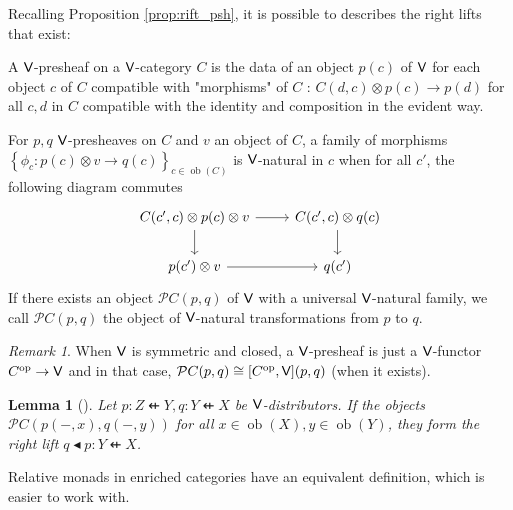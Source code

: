 \documentclass[10pt,a4paper]{article}
\newcommand{\ca}[1]{\mathcal{#1}}
\newcommand{\cat}[1]{\textcat{#1}}
\newcommand{\textcat}[1]{{\normalfont\textsf{#1}}}
\newcommand{\dfrom}{\nvleftarrow}
\newcommand{\op}{\mathrm{op}}
\newcommand{\rift}{\mathbin{\blacktriangleleft}}
\newcommand{\set}[1]{\left\{#1\right\}}
\newcommand{\simeqq}{\cong}
\DeclareMathOperator{\ob}{ob}
\theoremstyle{plain}
\newtheorem{lemma}[theorem]{Lemma}
\theoremstyle{definition}
\theoremstyle{remark}
\newtheorem{remark}[theorem]{Remark}
\begin{document}
Recalling Proposition \ref{prop:rift_psh}, it is possible to describes the right lifts that exist:

\begin{definition}
    A $\cat{V}$-presheaf on a $\cat{V}$-category $C$ is the data of an object $p(c)$ of $\cat{V}$ for each object $c$ of $C$ compatible with "morphisms" of $C$ : $C(d, c) \otimes p(c) \to p(d)$ for all $c, d$ in $C$ compatible with the identity and composition in the evident way.

    For $p, q$ $\cat{V}$-presheaves on $C$ and $v$ an object of $C$, a family of morphisms $\set{\phi_c : p(c)\otimes v \to q(c)}_{c\in\ob(C)}$ is $\cat{V}$-natural in $c$ when for all $c'$, the following diagram commutes
    \[\begin{tikzcd}
        C(c', c)\otimes p(c)\otimes v \dar \rar & C(c', c)\otimes q(c) \dar\\
        p(c')\otimes v \rar & q(c')
    \end{tikzcd}\]
    If there exists an object $\ca{P}C(p, q)$ of $\cat{V}$ with a universal $\cat{V}$-natural family, we call $\ca{P}C(p, q)$ the object of $\cat{V}$-natural transformations from $p$ to $q$.
\end{definition}

\begin{remark}
    When $\cat{V}$ is symmetric and closed, a $\cat{V}$-presheaf is just a $\cat{V}$-functor $C^\op \to \cat{V}$ and in that case, $\ca{P}C(p, q) \simeqq [C^\op, \cat{V}](p, q)$ (when it exists).
\end{remark}

\begin{lemma}[{\cite[Lemma 8.7]{arkor2024formaltheoryrelativemonads}}]
    Let $p : Z \dfrom Y, q : Y \dfrom X$ be $\cat{V}$-distributors. If the objects $\ca{P}C(p(-, x), q(-, y))$ for all $x\in\ob(X), y\in\ob(Y)$, they form the right lift $q\rift p : Y \dfrom X$.
\end{lemma}

Relative monads in enriched categories have an equivalent definition, which is easier to work with.
\end{document}
